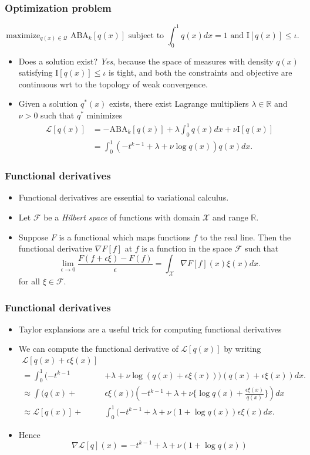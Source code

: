 \documentclass{beamer}
\begin{document}
\begin{frame}
\frametitle{Optimization problem}
\[
\text{maximize}_{q(x) \in \mathcal{Q}}\text{ ABA}_k[q(x)]\text{ subject to }\int_0^1 q(x) dx = 1\text{ and }\text{I}[q(x)] \leq \iota.
\]
\begin{itemize}
\item Does a solution exist? \emph{Yes}, because the space of measures
  with density $q(x)$ satisfying $\text{I}[q(x)] \leq \iota$ is tight,
  and both the constraints and objective are continuous wrt to the
  topology of weak convergence.
\item Given a solution $q^*(x)$ exists, there exist Lagrange multipliers $\lambda \in \mathbb{R}$ and $\nu > 0$ such that $q^*$ minimizes
\begin{align*}
\mathcal{L}[q(x)] &= -\text{ABA}_k[q(x)] + \lambda \int_0^1 q(x) dx + \nu \text{I}[q(x)]
\\&= \int_0^1 (-t^{k-1} + \lambda + \nu \log q(x)) q(x) dx.
\end{align*}
\end{itemize}

\end{frame}

\begin{frame}
\frametitle{Functional derivatives}
\begin{itemize}
\item Functional derivatives are essential to variational calculus.
\item Let $\mathcal{F}$ be a \emph{Hilbert space} of functions with domain $\mathcal{X}$ and range $\mathbb{R}$.
\item Suppose $F$ is a functional which maps functions $f$ to the real line.
Then the functional derivative $\nabla F[f]$ at $f$ is a function in the space $\mathcal{F}$ such that
\[
\lim_{\epsilon \to 0}\frac{F(f + \epsilon \xi) - F(f)}{\epsilon} = \int_{\mathcal{X}} \nabla F[f](x) \xi(x) dx.
\]
for all $\xi \in \mathcal{F}$.
\end{itemize}
\end{frame}

\begin{frame}
\frametitle{Functional derivatives}
\begin{itemize}
\item Taylor explansions are a useful trick for computing functional derivatives
\item We can compute the functional derivative of $\mathcal{L}[q(x)]$ by writing
\begin{align*}
\mathcal{L}[q(x) + \epsilon \xi(x)] &
\\= \int_0^1 (-t^{k-1} &+ \lambda + \nu \log (q(x) + \epsilon \xi(x))) (q(x) + \epsilon \xi(x)) dx.
\\\approx  \int (q(x) + &\epsilon \xi(x)) (-t^{k-1} + \lambda + \nu \{\log q(x) + \frac{\epsilon \xi(x)}{q(x)}\}) dx
\\\approx  \mathcal{L}[q(x)] +& \int_0^1 (-t^{k-1} + \lambda + \nu (1 + \log q(x)) \epsilon\xi(x) dx.
\end{align*}
\item Hence
\[
\nabla \mathcal{L}[q](x) = -t^{k-1} + \lambda + \nu (1 + \log q(x))
\]
\end{itemize}
\end{frame}
\end{document}

